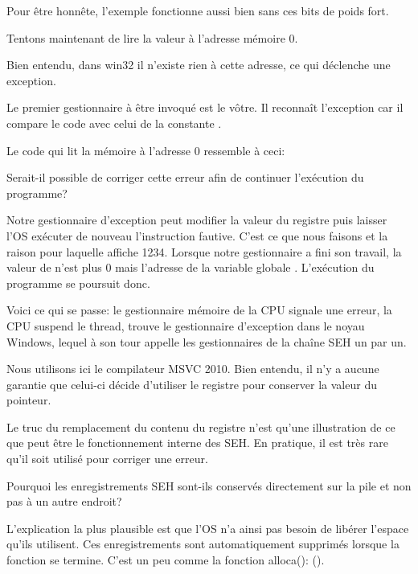 Pour être honnête, l'exemple fonctionne aussi bien sans ces bits de poids fort.

Tentons maintenant de lire la valeur à l'adresse mémoire 0.

Bien entendu, dans win32 il n'existe rien à cette adresse, ce qui déclenche une exception.

Le premier gestionnaire à être invoqué est le vôtre. Il reconnaît l'exception car il compare
le code avec celui de la constante .

Le code qui lit la mémoire à l'adresse 0 ressemble à ceci:



Serait-il possible de corriger cette erreur  afin de continuer l'exécution du programme?

Notre gestionnaire d'exception peut modifier la valeur du registre \EAX puis laisser l'\ac{OS}
exécuter de nouveau l'instruction fautive.
C'est ce que nous faisons et la raison pour laquelle \printf affiche 1234. Lorsque notre gestionnaire
a fini son travail, la valeur de \EAX n'est plus 0 mais l'adresse de la variable globale .
L'exécution du programme se poursuit donc.

Voici ce qui se passe: le gestionnaire mémoire de la \ac{CPU} signale une erreur, la \ac{CPU} suspend
le thread, trouve le gestionnaire d'exception dans le noyau Windows, lequel à son tour appelle les
gestionnaires de la chaîne \ac{SEH} un par un.

Nous utilisons ici le compilateur MSVC 2010. Bien entendu, il n'y a aucune garantie que celui-ci
décide d'utiliser le registre \EAX pour conserver la valeur du pointeur.

Le truc du remplacement du contenu du registre n'est qu'une illustration de ce que peut être le
fonctionnement interne des \ac{SEH}.
En pratique, il est très rare qu'il soit utilisé pour corriger  une erreur.

Pourquoi les enregistrements SEH sont-ils conservés directement sur la pile et non pas à un autre
endroit?

L'explication la plus plausible est que l'\ac{OS} n'a ainsi pas besoin de libérer l'espace qu'ils
utilisent. Ces enregistrements sont automatiquement supprimés lorsque la fonction se termine.
C'est un peu comme la fonction alloca(): ().

